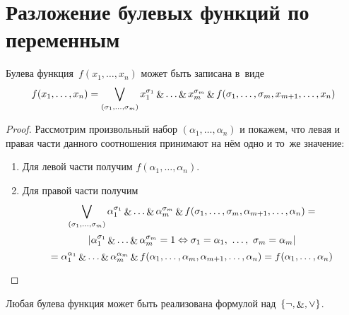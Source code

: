 \section{Разложение булевых функций по переменным}
\begin{theorem}
Булева функция~$f(x_1, \ldots, x_n)$ может быть записана в~виде
\begin{equation*}
f(x_1, \ldots, x_n) = \bigvee_{(\sigma_1, \ldots, \sigma_m)}
x_1^{\sigma_1} \mathop{\&} \ldots \mathop{\&} x_m^{\sigma_m} \mathop{\&} f(\sigma_1, \ldots, \sigma_m, x_{m+1}, \ldots, x_n)
\end{equation*}
\end{theorem}
\begin{proof}
Рассмотрим произвольный набор $(\alpha_1, \ldots, \alpha_n)$ и покажем, что левая и правая части данного соотношения принимают на нём одно и то~же значение:
\begin{enumerate}
	\item Для левой части получим $f(\alpha_1, \ldots, \alpha_n)$.
	\item Для правой части получим
	\begin{equation*}
	\bigvee_{(\sigma_1, \ldots, \sigma_m)}
	\alpha_1^{\sigma_1} \mathop{\&} \ldots \mathop{\&} \alpha_m^{\sigma_m} \mathop{\&} f(\sigma_1, \ldots, \sigma_m, \alpha_{m+1}, \ldots, \alpha_n) =
	\end{equation*}
	\begin{equation*}
	\left| \alpha_1^{\sigma_1} \mathop{\&} \ldots \mathop{\&} \alpha_m^{\sigma_m} = 1 \Leftrightarrow
	\sigma_1 = \alpha_1, \ \ldots, \ \sigma_m = \alpha_m \right|
	\end{equation*}
	\begin{equation*}
	= \alpha_1^{\alpha_1} \mathop{\&} \ldots \mathop{\&} \alpha_m^{\alpha_m} \mathop{\&} f(\alpha_1, \ldots, \alpha_m, \alpha_{m+1}, \ldots, \alpha_n)
	= f(\alpha_1, \ldots, \alpha_n)
	\end{equation*}
\end{enumerate}
\end{proof}

\begin{consequent}
Любая булева функция может быть реализована формулой над~$\{ \neg, \mathop{\&}, \lor \}$.
\end{consequent}
